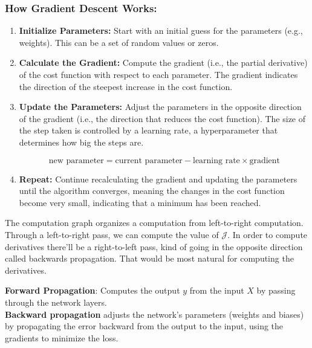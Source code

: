 \documentclass[letterpaper,12pt,notitlepage,twoside]{report}
\begin{document}
\subsubsection*{How Gradient Descent Works:}
\begin{enumerate}
    \item \textbf{Initialize Parameters:} Start with an initial guess for the parameters (e.g., weights). This can be a set of random values or zeros.
    
    \item \textbf{Calculate the Gradient:} Compute the gradient (i.e., the partial derivative) of the cost function with respect to each parameter. The gradient indicates the direction of the steepest increase in the cost function.
    
    \item \textbf{Update the Parameters:} Adjust the parameters in the opposite direction of the gradient (i.e., the direction that reduces the cost function). The size of the step taken is controlled by a learning rate, a hyperparameter that determines how big the steps are.
    
    \[
    \text{new parameter} = \text{current parameter} - \text{learning rate} \times \text{gradient}
    \]
    
    \item \textbf{Repeat:} Continue recalculating the gradient and updating the parameters until the algorithm converges, meaning the changes in the cost function become very small, indicating that a minimum has been reached.
\end{enumerate}

\newpage
\begin{funfact}[frametitle=\facttitlep{FunFact}{Computation Graph}]
The computation graph organizes a computation from left-to-right computation. Through a left-to-right pass, we can compute the value of $\mathcal{J}$. In order to compute derivatives there'll be a right-to-left pass, kind of going in the opposite direction called backwards propagation. That would be most natural for computing the derivatives. 
\end{funfact}

\textbf{Forward Propagation}: Computes the output $y$ from the input $X$ by passing through the network layers. \\
\textbf{Backward propagation} adjusts the network's parameters (weights and biases) by propagating the error backward from the output to the input, using the gradients to minimize the loss.
\end{document}
